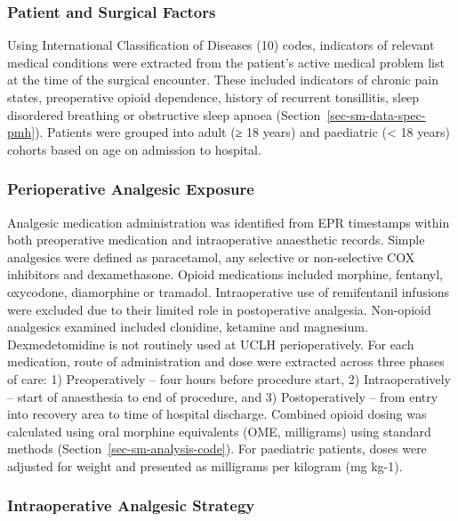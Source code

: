 \documentclass[
  letterpaper,
  DIV=11,
  numbers=noendperiod]{scrreprt}
\begin{document}
\subsubsection{Patient and Surgical
Factors}\label{patient-and-surgical-factors}

Using International Classification of Diseases (10) codes, indicators of
relevant medical conditions were extracted from the patient's active
medical problem list at the time of the surgical encounter. These
included indicators of chronic pain states, preoperative opioid
dependence, history of recurrent tonsillitis, sleep disordered breathing
or obstructive sleep apnoea (Section~\ref{sec-sm-data-spec-pmh}).
Patients were grouped into adult (≥ 18 years) and paediatric
(\textless{} 18 years) cohorts based on age on admission to hospital.

\subsubsection{Perioperative Analgesic
Exposure}\label{perioperative-analgesic-exposure}

Analgesic medication administration was identified from EPR timestamps
within both preoperative medication and intraoperative anaesthetic
records. Simple analgesics were defined as paracetamol, any selective or
non-selective COX inhibitors and dexamethasone. Opioid medications
included morphine, fentanyl, oxycodone, diamorphine or tramadol.
Intraoperative use of remifentanil infusions were excluded due to their
limited role in postoperative analgesia. Non-opioid analgesics examined
included clonidine, ketamine and magnesium. Dexmedetomidine is not
routinely used at UCLH perioperatively. For each medication, route of
administration and dose were extracted across three phases of care: 1)
Preoperatively -- four hours before procedure start, 2) Intraoperatively
-- start of anaesthesia to end of procedure, and 3) Postoperatively --
from entry into recovery area to time of hospital discharge. Combined
opioid dosing was calculated using oral morphine equivalents (OME,
milligrams) using standard methods (Section~\ref{sec-sm-analysis-code}).
For paediatric patients, doses were adjusted for weight and presented as
milligrams per kilogram (mg kg-1).

\subsubsection{Intraoperative Analgesic
Strategy}\label{intraoperative-analgesic-strategy}
\end{document}
